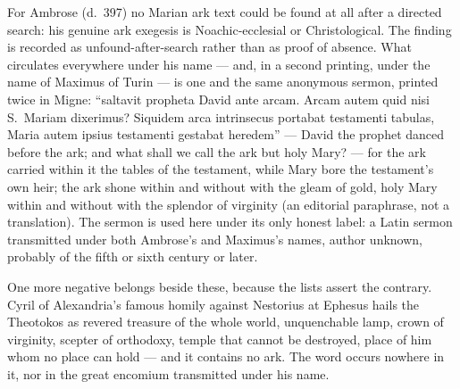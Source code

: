 For Ambrose (d.~397) no Marian ark text could be found at all after a
directed search: his genuine ark exegesis is Noachic-ecclesial or
Christological. The finding is recorded as unfound-after-search
rather than as proof of absence. What circulates everywhere under his
name --- and, in a second printing, under the name of Maximus of Turin
--- is one and the same anonymous sermon, printed twice in Migne:
``saltavit propheta David ante arcam. Arcam autem quid nisi
S.~Mariam dixerimus? Siquidem arca intrinsecus portabat testamenti
tabulas, Maria autem ipsius testamenti gestabat heredem'' --- David
the prophet danced before the ark; and what shall we call the ark but
holy Mary? --- for the ark carried within it the tables of the
testament, while Mary bore the testament's own heir; the ark shone
within and without with the gleam of gold, holy Mary within and
without with the splendor of virginity (an editorial paraphrase, not a
translation). The sermon is used here under its only honest label: a
Latin sermon transmitted under both Ambrose's and Maximus's names,
author unknown, probably of the fifth or sixth century or
later.

One more negative belongs beside these, because the lists assert the
contrary. Cyril of Alexandria's famous homily against Nestorius at
Ephesus hails the Theotokos as revered treasure of the whole world,
unquenchable lamp, crown of virginity, scepter of orthodoxy, temple
that cannot be destroyed, place of him whom no place can hold --- and
it contains no ark. The word  occurs nowhere in it, nor
in the great encomium transmitted under his name.

